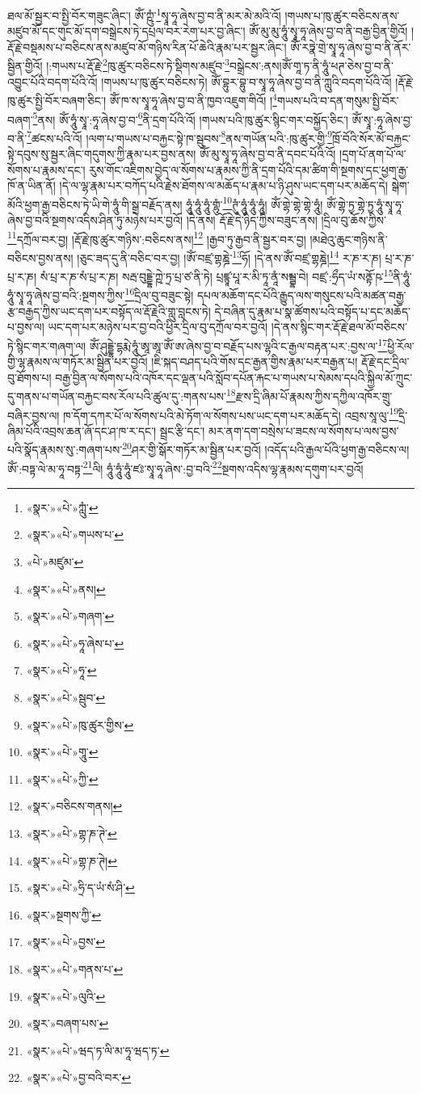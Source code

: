 ཐལ་མོ་སྦྱར་བ་སྤྱི་བོར་གཟུང་ཞིང་། ཨོཾ་ཀྵུཾ་\footnote{«སྣར་»«པེ་»ཀླུཾ་}སྭཱ་ཧཱ་ཞེས་བྱ་བ་ནི་མར་མེ་མའི་འོ། །གཡས་པ་ཁུ་ཚུར་བཅིངས་ནས་མཛུབ་མོ་དང་གུང་མོ་དག་བསྒྲེངས་ཏེ་དཔྲལ་བར་རེག་པར་བྱ་ཞིང་། ཨོཾ་མུ་མུ་ཧཱུཾ་སྭཱ་ཧཱ་ཞེས་བྱ་བ་ནི་བརྒྱ་བྱིན་གྱིའོ། །རྡོ་རྗེ་བསྡམས་པ་བཅིངས་ནས་མཛུབ་མོ་གཉིས་རིན་པོ་ཆེའི་རྣམ་པར་སྦྱར་ཞིང་། ཨོཾ་རཏྣེ་གྲེ་སྭཱ་ཧཱ་ཞེས་བྱ་བ་ནི་ནོར་སྦྱིན་གྱིའོ། །:གཡས་པ་རྡོ་རྗེ་\footnote{«སྣར་»«པེ་»གཡས་པ་}ཁུ་ཚུར་བཅིངས་ཏེ་སྡིགས་མཛུབ་\footnote{«པེ་»མཛུམ་}བསྒྲེངས་:ནས།ཨོཾ་གཱ་ཏ་ནི་ཧཱུཾ་ཕཊ་ཅེས་བྱ་བ་ནི་འབྱུང་པོའི་བདག་པོའི་འོ། །གཡས་པ་ཁུ་ཚུར་བཅིངས་ཏེ། ཨོཾ་བྷུར་བྷུ་བ་སྭཱ་ཧཱ་ཞེས་བྱ་བ་ནི་ཀླུའི་བདག་པོའི་འོ། །རྡོ་རྗེ་ཁུ་ཚུར་སྤྱི་བོར་བཞག་ཅིང་། ཨོཾ་ཁ་ས་སྭཱ་ཧཱ་ཞེས་བྱ་བ་ནི་ཁྱབ་འཇུག་གིའོ། །\footnote{«སྣར་»«པེ་»ནས།}གཡས་པའི་བ་དན་གསུམ་སྤྱི་བོར་བཞག་\footnote{«སྣར་»«པེ་»གཞག་}ནས། ཨོཾ་ཧཱུཾ་སྭཱ་:ཧཱ་ཞེས་བྱ་བ་\footnote{«སྣར་»«པེ་»ཧཱ་ཞེས་པ་}ནི་དྲག་པོའི་འོ། །གཡས་པའི་ཁུ་ཚུར་སྙིང་གར་བསྐྱོད་ཅིང་། ཨོཾ་སྭཱ་:ཧཱ་ཞེས་བྱ་བ་ནི་\footnote{«སྣར་»«པེ་»ཧཱ་}ཚངས་པའི་འོ། །ལག་པ་གཡས་པ་བརྐྱང་སྟེ་ཁ་སྦུབས་\footnote{«སྣར་»«པེ་»སྦུབ་}ནས་གཡོན་པའི་:ཁུ་ཚུར་གྱི་\footnote{«སྣར་»«པེ་»ཁུ་ཚུར་གྱིས་}ཁྲོ་བོའི་སོར་མོ་བརྐྱང་སྟེ་དབུས་སུ་སྦྱར་ཞིང་གདུགས་ཀྱི་རྣམ་པར་བྱས་ནས། ཨོཾ་མུ་སྭཱ་ཧཱ་ཞེས་བྱ་བ་ནི་དབང་པོའི་འོ། །དྲག་པོ་ནག་པོ་ལ་སོགས་པ་རྣམས་དང་། རུས་གོང་འཇིགས་བྱེད་ལ་སོགས་པ་རྣམས་ཀྱི་ནི་དྲག་པོའི་དམ་ཚིག་གི་སྔགས་དང་ཕྱག་རྒྱ་ཁོ་ན་ཡིན་ནོ། །དེ་ལ་ལྷ་རྣམ་པར་བཀོད་པའི་རྗེས་ཐོགས་ལ་མཆོད་པ་རྣམ་པ་ཉི་ཤུས་ཡང་དག་པར་མཆོད་དེ། སྒེག་མོའི་ཕྱག་རྒྱ་བཅིངས་ཏེ་ཡི་གེ་ཧཱུཾ་གི་སྒྲ་བརྗོད་ནས། ཧཱུཾ་ཧཱུཾ་ཧཱུཾ་གྷུཾ་\footnote{«སྣར་»«པེ་»གཱུ་}ཊུཾ་ཧཱུཾ་ཧཱུཾ་ཧཱུཾ། ཨོཾ་གྷེ་གྷེ་གྷེ་ཧཱུཾ། ཨོཾ་གྷེ་ཏྱ་གྷེ་ཏྱ་ཧཱུཾ་སྭཱ་ཧཱ་ཞེས་བྱ་བའི་སྔགས་འདིས་ཤིན་ཏུ་མཉེས་པར་བྱའོ། །དེ་ནས། རྡོ་རྗེ་དེ་ཉིད་ཀྱིས་བཟུང་ནས། །དྲིལ་བུ་ཆོས་ཀྱིས་\footnote{«སྣར་»«པེ་»ཀྱི་}དཀྲོལ་བར་བྱ། །རྡོ་རྗེ་ཁུ་ཚུར་གཉིས་:བཅིངས་ནས།\footnote{«སྣར་»བཅིངས་གནས།} །རྒྱབ་ཏུ་རྒྱབ་ནི་སྦྱར་བར་བྱ། །མཐེའུ་ཆུང་གཉིས་ནི་བཅིངས་བྱས་ནས། །ཅུང་ཟད་དུ་ནི་བཅིང་བར་བྱ། །ཨོཾ་བཛྲ་གྷཎྜེ་\footnote{«སྣར་»«པེ་»གྷ་ཎ་ཊེ་}ཧོ། །དེ་ནས་ཨོཾ་བཛྲ་གྷཎྜེ།\footnote{«སྣར་»«པེ་»གྷ་ཎ་ཊེ།} ར་ཎ་ར་ཎ། པྲ་ར་ཎ་པྲ་ར་ཎ། སཾ་པྲ་ར་ཎ་སཾ་པྲ་ར་ཎ། སརྦ་བུདྡྷེ་ཀྵེ་ཏྲ་པྲ་ཙ་ནི་ཏེ། པྲཛྙཱ་པཱ་ར་མི་ཏཱ་ནཱཾ་སམྦྷ་བེ། བཛྲ་:ཧྲྀད་ཡཾ་སནྟོ་ཥ་\footnote{«སྣར་»«པེ་»ཧྲི་ད་ཡཾ་སཾ་ཤི་}ནི་ཧཱུཾ་ཧཱུཾ་སྭཱ་ཧཱ་ཞེས་བྱ་བའི་:སྔགས་ཀྱིས་\footnote{«སྣར་»སྔགས་ཀྱི་}དྲིལ་བུ་བཟུང་སྟེ། དཔལ་མཆོག་དང་པོའི་རྒྱུད་ལས་གསུངས་པའི་མཚན་བརྒྱ་རྩ་བརྒྱད་ཀྱིས་ཡང་དག་པར་བསྟོད་ལ་རྡོ་རྗེའི་གླུ་བླངས་ཏེ། དེ་བཞིན་དུ་རྣམ་པ་སྣ་ཚོགས་པའི་བསྟོད་པ་དང་མཆོད་པ་བྱས་ལ། ཡང་དག་པར་མཉེས་པར་བྱ་བའི་ཕྱིར་དྲིལ་བུ་དཀྲོལ་བར་བྱའོ། །དེ་ནས་སྙིང་གར་རྡོ་རྗེ་ཐལ་མོ་བཅིངས་ཏེ་སྙིང་གར་གཞག་ལ། ཨོཾ་ཤུདྡྷེ་དྷརྨེ་ཧཱུཾ་ཨཱ་ཨཱ་ཨོཾ་ཨ་ཞེས་བྱ་བ་བརྗོད་པས་ལྷའི་ང་རྒྱལ་བརྟན་པར་:བྱས་ལ་\footnote{«སྣར་»«པེ་»བྱས་}ཕྱི་རོལ་གྱི་ལྷ་རྣམས་ལ་གཏོར་མ་སྦྱིན་པར་བྱའོ། །ཇི་སྐད་བཤད་པའི་གོས་དང་རྒྱན་གྱིས་རྣམ་པར་བརྒྱན་པ། རྡོ་རྗེ་དང་དྲིལ་བུ་ཐོགས་པ། བརྒྱ་བྱིན་ལ་སོགས་པའི་འཁོར་དང་ལྡན་པའི་སློབ་དཔོན་རྐང་པ་གཡས་པ་སེམས་དཔའི་སྐྱིལ་མོ་ཀྲུང་དུ་གནས་པ་གཡོན་བརྐྱང་བས་རོལ་པའི་ཚུལ་དུ་:གནས་པས་\footnote{«སྣར་»«པེ་»གནས་པ་}རྫས་དྲི་ཞིམ་པོ་རྣམས་ཀྱིས་དཀྱིལ་འཁོར་གྲུ་བཞིར་བྱས་ལ། ཁ་དོག་དཀར་པོ་ལ་སོགས་པའི་མེ་ཏོག་ལ་སོགས་པས་ཡང་དག་པར་མཆོད་དེ། འབྲས་སཱ་ལུ་\footnote{«སྣར་»«པེ་»ལུའི་}དྲི་ཞིམ་པོའི་འབྲས་ཆན་ཞོ་དང་ཤ་ཁ་ར་དང་། སྦྲང་རྩི་དང་། མར་ནག་དག་བསྲེས་པ་ཟངས་ལ་སོགས་པ་ལས་བྱས་པའི་སྣོད་རྣམས་སུ་:གཞག་པས་\footnote{«སྣར་»བཞག་པས་}ཤར་གྱི་སྒོར་གཏོར་མ་སྦྱིན་པར་བྱའོ། །འདོད་པའི་རྒྱལ་པོའི་ཕྱག་རྒྱ་བཅིངས་ལ། ཨོཾ་:བཏྟ་ལེ་མ་ཧཱ་བཏྟ་\footnote{«སྣར་»«པེ་»ཝད་ཏ་ལི་མ་ཧཱ་ཝད་ཏ་}ལི། ཧཱུཾ་ཧཱུཾ་ཧཱུཾ་ཛཿ་སྭཱ་ཧཱ་ཞེས་:བྱ་བའི་\footnote{«སྣར་»«པེ་»བྱ་བའི་བར་}སྔགས་འདིས་ལྷ་རྣམས་དགུག་པར་བྱའོ། 
